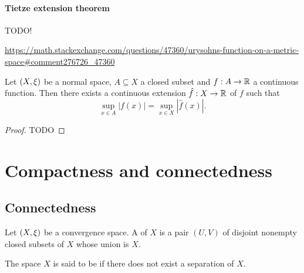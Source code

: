 \subsubsection{Tietze extension theorem}
TODO!

\url{https://math.stackexchange.com/questions/47360/urysohns-function-on-a-metric-space#comment276726_47360}

\begin{theorem} \label{TietzeExtension}
Let $\sSet{X,\xi}$ be a normal space, $A\subseteq X$ a closed subset and $f:A\to \mathbb{R}$ a continuous function. Then there exists a continuous extension $\hat{f}: X\to \mathbb{R}$ of $f$ such that
\[ \sup_{x\in A}|f(x)| = \sup_{x\in X}|\hat{f}(x)|. \]
\end{theorem}
\begin{proof}
TODO
\end{proof}



\chapter{Compactness and connectedness}


\section{Connectedness}
\begin{definition}
Let $\sSet{X, \xi}$ be a convergence space. A  of $X$ is a pair $(U,V)$ of disjoint nonempty closed subsets of $X$ whose union is $X$.

The space $X$ is said to be  if there does not exist a separation of $X$.
\end{definition}

